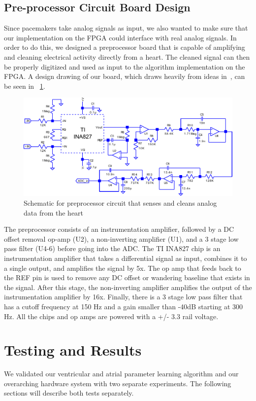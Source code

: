 \documentclass[conference]{IEEEtran}
\begin{document}
\subsection{Pre-processor Circuit Board Design}
Since pacemakers take analog signals as input,
we also wanted to make sure that our implementation on the
FPGA could interface with real analog signals.
In order to do this, we designed a preprocessor board that is
capable of amplifying and cleaning electrical activity directly from a heart.
The cleaned signal can then be properly 
digitized and used as input to the algorithm implementation
on the FPGA. A design drawing of our board, which
draws heavily from ideas in~\cite{analog-adcs}, 
can be seen in \figurename~\ref{fig:schematic}.

\begin{figure}[h]
	\centering
	\includegraphics[width=.9\columnwidth]{schematic.pdf}
	\caption{Schematic for preprocessor circuit that senses and cleans analog data from the heart}
	\label{fig:schematic}
\end{figure}

The preprocessor consists of an instrumentation
amplifier, followed by a DC offset removal op-amp (U2), a
non-inverting amplifier (U1), and a 3 stage low pass filter (U4-6)
before going into the ADC.
The TI INA827 chip is an instrumentation
amplifier that takes a differential signal as input,
combines it to a single output, and amplifies the signal
by 5x. The op amp that feeds back to the REF pin is used to
remove any DC offset or wandering baseline that exists
in the signal. After this stage, the non-inverting amplifier
amplifies the output of the instrumentation amplifier by
16x. Finally, there is a 3 stage low pass filter that has a
cutoff frequency at 150 Hz and a gain smaller than -40dB 
starting at 300 Hz. All the chips and op amps are
powered with a +/- 3.3 rail voltage.

\section{Testing and Results}
We validated our ventricular and atrial parameter
learning algorithm and our overarching hardware system
with two separate experiments. The following sections
will describe both tests separately.
\end{document}
